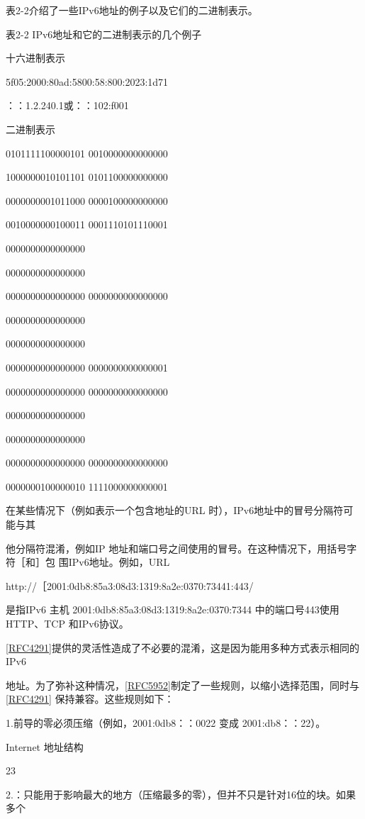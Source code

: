 表2-2介绍了一些IPv6地址的例子以及它们的二进制表示。

表2-2 IPv6地址和它的二进制表示的几个例子

十六进制表示

5f05:2000:80ad:5800:58:800:2023:1d71

：：1.2.240.1或：：102:f001

二进制表示

0101111100000101 0010000000000000

1000000010101101 0101100000000000

0000000001011000 0000100000000000

0010000000100011 0001110101110001

0000000000000000

0000000000000000

0000000000000000 0000000000000000

0000000000000000

0000000000000000

0000000000000000 0000000000000001

0000000000000000 0000000000000000

0000000000000000

0000000000000000

0000000000000000 0000000000000000

0000000100000010 1111000000000001

在某些情况下（例如表示一个包含地址的URL 时），IPv6地址中的冒号分隔符可能与其

他分隔符混淆，例如IP 地址和端口号之间使用的冒号。在这种情况下，用括号字符［和］包
围IPv6地址。例如，URL

http://［2001:0db8:85a3:08d3:1319:8a2e:0370:73441:443/

是指IPv6 主机 2001:0db8:85a3:08d3:1319:8a2e:0370:7344 中的端口号443使用HTTP、TCP
和IPv6协议。

\href{https://www.rfc-editor.org/rfc/rfc4291}{[RFC4291]}提供的灵活性造成了不必要的混淆，这是因为能用多种方式表示相同的IPv6

地址。为了弥补这种情况，\href{https://www.rfc-editor.org/rfc/rfc5952}{[RFC5952]}制定了一些规则，以缩小选择范围，同时与\href{https://www.rfc-editor.org/rfc/rfc4291}{[RFC4291]}
保持兼容。这些规则如下：

1.前导的零必须压缩（例如，2001:0db8：：0022 变成 2001:db8：：22）。

Internet 地址结构

23

2.：只能用于影响最大的地方（压缩最多的零），但并不只是针对16位的块。如果多个

